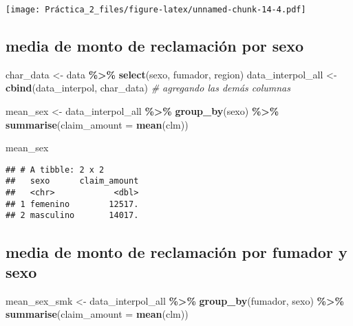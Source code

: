 \documentclass[
]{article}
\newenvironment{Shaded}{\begin{snugshade}}{\end{snugshade}}
\newcommand{\AttributeTok}[1]{\textcolor[rgb]{0.13,0.29,0.53}{#1}}
\newcommand{\CommentTok}[1]{\textcolor[rgb]{0.56,0.35,0.01}{\textit{#1}}}
\newcommand{\FunctionTok}[1]{\textcolor[rgb]{0.13,0.29,0.53}{\textbf{#1}}}
\newcommand{\NormalTok}[1]{#1}
\newcommand{\OtherTok}[1]{\textcolor[rgb]{0.56,0.35,0.01}{#1}}
\newcommand{\SpecialCharTok}[1]{\textcolor[rgb]{0.81,0.36,0.00}{\textbf{#1}}}
\begin{document}
\texttt{[image: Práctica\_2\_files/figure-latex/unnamed-chunk-14-4.pdf]}

\subsection{media de monto de reclamación por
sexo}\label{media-de-monto-de-reclamaciuxf3n-por-sexo}

\begin{Shaded}
\begin{Highlighting}[]
\NormalTok{char\_data }\OtherTok{\textless{}{-}}\NormalTok{ data }\SpecialCharTok{\%\textgreater{}\%} \FunctionTok{select}\NormalTok{(sexo, fumador, region)}
\NormalTok{data\_interpol\_all }\OtherTok{\textless{}{-}} \FunctionTok{cbind}\NormalTok{(data\_interpol, char\_data)  }\CommentTok{\# agregando las demás columnas}

\NormalTok{mean\_sex }\OtherTok{\textless{}{-}}\NormalTok{ data\_interpol\_all }\SpecialCharTok{\%\textgreater{}\%}
        \FunctionTok{group\_by}\NormalTok{(sexo) }\SpecialCharTok{\%\textgreater{}\%}
        \FunctionTok{summarise}\NormalTok{(}\AttributeTok{claim\_amount =} \FunctionTok{mean}\NormalTok{(clm))}

\NormalTok{mean\_sex}
\end{Highlighting}
\end{Shaded}

\begin{verbatim}
## # A tibble: 2 x 2
##   sexo      claim_amount
##   <chr>            <dbl>
## 1 femenino        12517.
## 2 masculino       14017.
\end{verbatim}

\subsection{media de monto de reclamación por fumador y
sexo}\label{media-de-monto-de-reclamaciuxf3n-por-fumador-y-sexo}

\begin{Shaded}
\begin{Highlighting}[]
\NormalTok{mean\_sex\_smk }\OtherTok{\textless{}{-}}\NormalTok{ data\_interpol\_all }\SpecialCharTok{\%\textgreater{}\%}
        \FunctionTok{group\_by}\NormalTok{(fumador, sexo) }\SpecialCharTok{\%\textgreater{}\%}
        \FunctionTok{summarise}\NormalTok{(}\AttributeTok{claim\_amount =} \FunctionTok{mean}\NormalTok{(clm))}
\end{Highlighting}
\end{Shaded}
\end{document}
